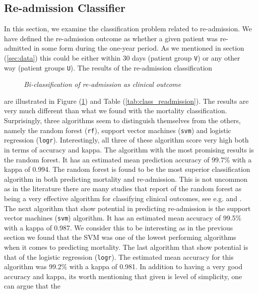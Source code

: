 \documentclass[../thesis.tex]{subfiles}
\begin{document}
\subsection{Re-admission Classifier}

\noindent In this section, we examine the classification problem related to re-admission. We have defined the re-admission outcome as whether a given patient was re-admitted in some form during the one-year period. As we mentioned in section (\ref{sec:data}) this could be either within 30 days (patient group \texttt{V}) or any other way (patient groups \texttt{U}). The results of the re-admission classification 

\begin{figure}[h!]
    \centering
    \scalebox{.8}{}
    \caption[Bi-classification of re-admission as clinical outcome]{\textit{Bi-classification of re-admission as clinical outcome}}
    \label{fig:bi_class_read}
\end{figure}

\noindent are illustrated in Figure (\ref{fig:bi_class_read}) and Table (\ref{tab:class_readmission}). The results are very much different than what we found with the mortality classification. Surprisingly, three algorithms seem to distinguish themselves from the others, namely the random forest (\texttt{rf}), support vector machines (\texttt{svm}) and logistic regression (\texttt{logr}). Interestingly, all three of these algorithm score very high both in terms of accuracy and kappa. The algorithm with the most promising results is the random forest. It has an estimated mean prediction accuracy of 99.7\% with a kappa of 0.994. The random forest is found to be the most superior classification algorithm in both predicting mortality and re-admission. This is not uncommon as in the literature there are many studies that report of the random forest as being a very effective algorithm for classifying clinical outcomes, see e.g. \cite{austin2013using} and \cite{zolfaghar2013big}. The next algorithm that show potential in predicting re-admission is the support vector machines (\texttt{svm}) algorithm. It has an estimated mean accuracy of 99.5\% with a kappa of 0.987. We consider this to be interesting as in the previous section we found that the SVM was one of the lowest performing algorithms when it comes to predicting mortality. The last algorithm that show potential is that of the logistic regression (\texttt{logr}). The estimated mean accuracy for this algorithm was 99.2\% with a kappa of 0.981. In addition to having a very good accuracy and kappa, its worth mentioning that given is level of simplicity, one can argue that the  
\end{document}
